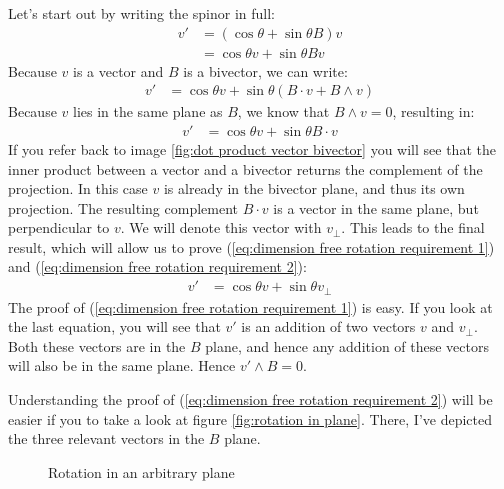 \documentclass[10pt]{report}
\begin{document}
Let's start out by writing the spinor in full:
\begin{align*}
    v' &= (\cos \theta + \sin \theta B) v   \\
       &= \cos \theta v + \sin \theta B v
\end{align*}
Because $v$ is a vector and $B$ is a bivector, we can write:
\begin{align*}
    v' &= \cos \theta v + \sin \theta (B\cdot v + B\wedge v)
\end{align*}
Because $v$ lies in the same plane as $B$, we know that $B\wedge v
= 0$, resulting in:
\begin{align*}
    v' &= \cos \theta v + \sin \theta B\cdot v
\end{align*}
If you refer back to image \ref{fig:dot product vector bivector}
you will see that the inner product between a vector and a
bivector returns the complement of the projection. In this case
$v$ is already in the bivector plane, and thus its own projection.
The resulting complement $B\cdot v$ is a vector in the same plane,
but perpendicular to $v$. We will denote this vector with
$v_\bot$. This leads to the final result, which will allow us to
prove (\ref{eq:dimension free rotation requirement 1}) and
(\ref{eq:dimension free rotation requirement 2}):
\begin{align*}
    v' &= \cos \theta v + \sin \theta v_\bot
\end{align*}
The proof of (\ref{eq:dimension free rotation requirement 1}) is
easy. If you look at the last equation, you will see that $v'$ is
an addition of two vectors $v$ and $v_\bot$. Both these vectors
are in the $B$ plane, and hence any addition of these vectors will
also be in the same plane. Hence $v'\wedge B = 0$.

Understanding the proof of (\ref{eq:dimension free rotation
requirement 2}) will be easier if you to take a look at figure
\ref{fig:rotation in plane}. There, I've depicted the three
relevant vectors in the $B$ plane.
\begin{figure}[ht]
\centering

\caption{Rotation in an arbitrary plane} \label{fig:rotation in
plane}
\end{figure}
\end{document}
